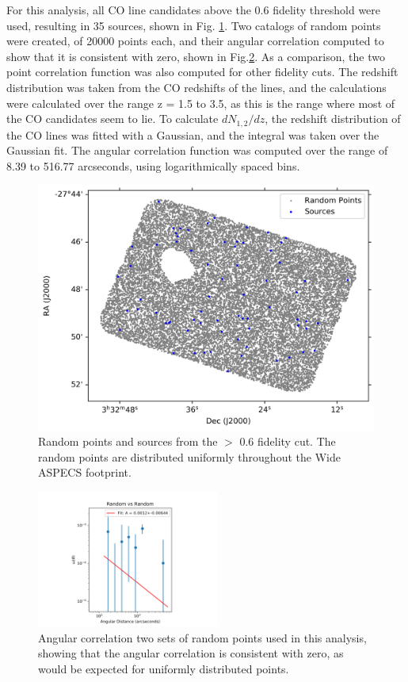 For this analysis, all CO line candidates above the 0.6 fidelity threshold were used, resulting in 35 sources, shown in Fig. \ref{fig:Clustering_points}. Two catalogs of random points were created, of 20000 points each, and their angular correlation computed to show that it is consistent with zero, shown in Fig.\ref{fig:random_points}. As a comparison, the two point correlation function was also computed for other fidelity cuts. The redshift distribution was taken from the CO redshifts of the lines, and the calculations were calculated over the range z = 1.5 to 3.5, as this is the range where most of the CO candidates seem to lie. To calculate $dN_{1,2}/dz$, the redshift distribution of the CO lines was fitted with a Gaussian, and the integral was taken over the Gaussian fit. The angular correlation function was computed over the range of 8.39 to 516.77 arcseconds, using logarithmically spaced bins. 


\begin{figure}[tbp]
\centering \includegraphics[width=120mm]{PDFS/NX_V_Y_Sources_20000.png}
\caption{Random points and sources from the $>$ 0.6 fidelity cut. The random points are distributed uniformly throughout the Wide ASPECS footprint.}
\label{fig:Clustering_points}
\end{figure}

\begin{figure}[tbp]
\centering \includegraphics[width=60mm]{clustering/Log_Random_vs_Random_15000NoParenFlip_bin10.png}
\caption{Angular correlation two sets of random points used in this analysis, showing that the angular correlation is consistent with zero, as would be expected for uniformly distributed points.}
\label{fig:random_points}
\end{figure}

